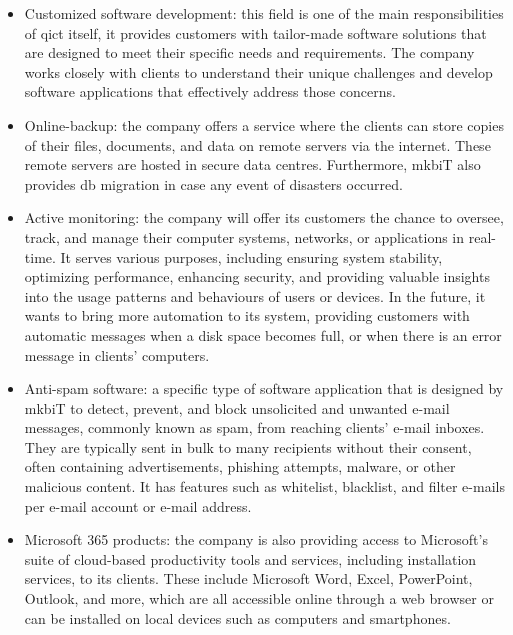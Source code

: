 \begin{itemize}
      \item Customized software development: this field is one of the main responsibilities of \acrshort{qict} itself, it provides
            customers with tailor-made software solutions that are designed to meet their specific needs and requirements. The company
            works closely with clients to understand their unique challenges and develop software applications that effectively address
            those concerns.
      \item Online-backup: the company offers a service where the clients can store copies of their files, documents, and data on remote
            servers via the internet. These remote servers are hosted in secure data centres. Furthermore, \acrshort{mkb}iT also provides
            \acrshort{db} migration in case any event of disasters occurred.
      \item Active monitoring: the company will offer its customers the chance to oversee, track, and manage their computer systems,
            networks, or applications in real-time. It serves various purposes, including ensuring system stability, optimizing
            performance, enhancing security, and providing valuable insights into the usage patterns and behaviours of users or devices.
            In the future, it wants to bring more automation to its system, providing customers with automatic messages when a disk space
            becomes full, or when there is an error message in clients' computers.
      \item Anti-spam software: a specific type of software application that is designed by \acrshort{mkb}iT to detect, prevent, and block
            unsolicited and unwanted e-mail messages, commonly known as spam, from reaching clients' e-mail inboxes. They are typically
            sent in bulk to many recipients without their consent, often containing advertisements, phishing attempts, malware, or other
            malicious content. It has features such as whitelist, blacklist, and filter e-mails per e-mail account or e-mail address.
      \item Microsoft 365 products: the company is also providing access to Microsoft's suite of cloud-based productivity tools and
            services, including installation services, to its clients. These include Microsoft Word, Excel, PowerPoint, Outlook, and more,
            which are all accessible online through a web browser or can be installed on local devices such as computers and smartphones.

\end{itemize}

